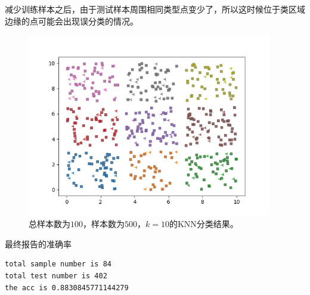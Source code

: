 \documentclass{article}
\begin{document}
减少训练样本之后，由于测试样本周围相同类型点变少了，所以这时候位于类区域边缘的点可能会出现误分类的情况。
\begin{figure}[H]
    \centering
    \begin{minipage}[t]{1.0\linewidth}
        \centering
        \includegraphics[height=8cm]{add1.png}
        \caption{总样本数为$100$，样本数为$500$，$k=10$的KNN分类结果。}
    \end{minipage}
 \end{figure}
 最终报告的准确率
 \begin{verbatim}
total sample number is 84
total test number is 402
the acc is 0.8830845771144279
\end{verbatim}
\end{document}
